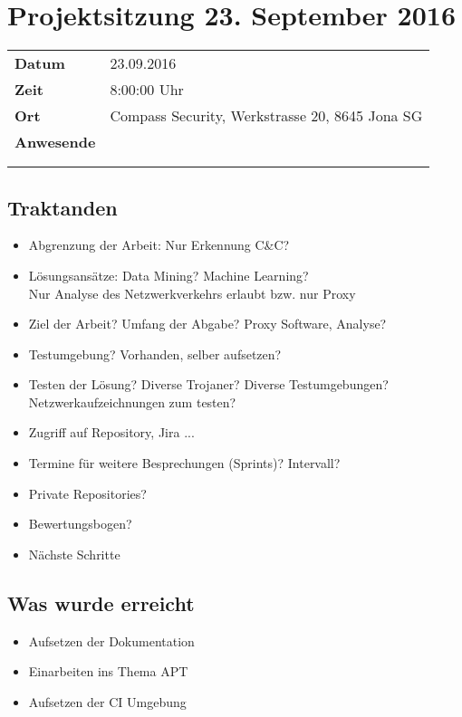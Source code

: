 \documentclass[class=scrbook,crop=false]{standalone}
\begin{document}
	\section{Projektsitzung 23. September 2016}

	\begin{tabular}{ll}
		\textbf{Datum} & 23.09.2016 \\
		\textbf{Zeit} & 8:00\textendash9:00 Uhr \\
		\textbf{Ort} & Compass Security, Werkstrasse 20, 8645 Jona SG \\
		\textbf{Anwesende} & \ibuf \\ & \fbif \\ & \sadf
	\end{tabular}

	\subsection*{Traktanden}
	\begin{itemize}
		\item Abgrenzung der Arbeit: Nur Erkennung C\&C?
		\item Lösungsansätze: Data Mining? Machine Learning? \\
			Nur Analyse des Netzwerkverkehrs erlaubt bzw. nur Proxy
		\item Ziel der Arbeit? Umfang der Abgabe? Proxy Software, Analyse?
		\item Testumgebung? Vorhanden, selber aufsetzen?
		\item Testen der Lösung? Diverse Trojaner? Diverse Testumgebungen? Netzwerkaufzeichnungen zum testen?
		\item Zugriff auf Repository, Jira ...
		\item Termine für weitere Besprechungen (Sprints)? Intervall?
		\item Private Repositories?
		\item Bewertungsbogen?
		\item Nächste Schritte
	\end{itemize}

	\subsection*{Was wurde erreicht}
	\begin{itemize}
		\item Aufsetzen der Dokumentation
		\item Einarbeiten ins Thema APT
		\item Aufsetzen der CI Umgebung
	\end{itemize}
\end{document}
